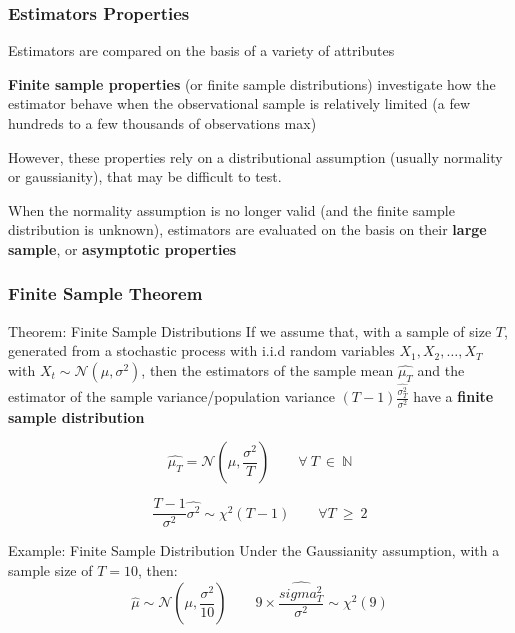 \documentclass{beamer}
\newenvironment{wideenumerate}{\enumerate\addtolength{\itemsep}{10pt}}{\endenumerate}
\begin{document}
  \begin{frame}
    \frametitle{Estimators Properties}
    Estimators are compared on the basis of a variety of attributes

    \begin{wideenumerate}
      \item \textbf{Finite sample properties} (or finite sample distributions) investigate how the estimator behave when the observational sample is relatively limited (a few hundreds to a few thousands of observations max)
      \item However, these properties rely on a distributional assumption (usually normality or gaussianity), that may be difficult to test. 
      \item When the normality assumption is no longer valid (and the finite sample distribution is unknown), estimators are evaluated on the basis on their \textbf{large sample}, or \textbf{asymptotic properties}
    \end{wideenumerate}
    
  \end{frame}



  \begin{frame}
    \frametitle{Finite Sample Theorem}
    \begin{block}{Theorem: Finite Sample Distributions}
        If we assume that, with a sample of size $T$, generated from a stochastic process with i.i.d random variables $X_1, X_2, \dots, X_T$  with $X_{t} \sim \mathcal{N}(\mu, \sigma^2)$, then the estimators of the sample mean $\hat{\mu_T}$ and the estimator of the sample variance/population variance $(T-1) \frac{\hat{\sigma^2_T}}{\sigma^2}$ have a \textbf{finite sample distribution}

        \begin{equation*}
          \hat{\mu_T} = \mathcal{N}\left(\mu, \frac{\sigma^2}{T} \right) \qquad \forall \ T \ \in \ \mathbb{N}
        \end{equation*}


        \begin{equation*}
          \frac{T-1}{\sigma^2} \hat{\sigma^2} \sim \chi^{2} (T-1) \qquad \forall T \ \geq \ 2
        \end{equation*}
        
      \end{block}


      \begin{exampleblock}{Example: Finite Sample Distribution}
        Under the Gaussianity assumption, with a sample size of $T = 10$, then:
        \begin{equation*}
          \hat{\mu} \sim \mathcal{N}\left( \mu, \frac{\sigma^2}{10} \right) \qquad 9 \times \frac{\hat{sigma^2_T}}{\sigma^2} \sim \chi^2(9)
        \end{equation*}        
      \end{exampleblock}
      
  \end{frame}
  
\end{document}
